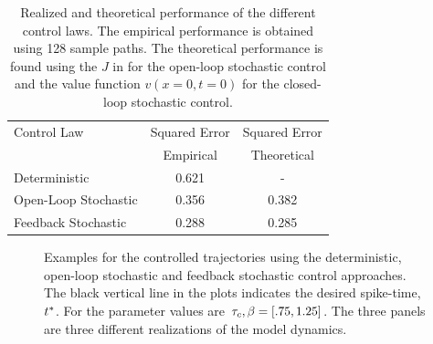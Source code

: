 \documentclass{article}
\begin{document}
\begin{table}[h] 
\centering
\begin{tabular}{lcc}
Control Law & Squared Error &  Squared Error \\
 & Empirical & Theoretical\\
\hline
Deterministic &  0.621 & - \\
Open-Loop Stochastic & 0.356 & 0.382\\
Feedback Stochastic &  0.288& 0.285\\
\hline
\end{tabular}
\caption{Realized and theoretical performance of the different control laws. The empirical
performance is obtained using 128 sample paths. The theoretical performance is
found using the $J$ in for the open-loop stochastic control and the value
function $v(x=0, t =0)$ for the closed-loop stochastic control.}
\label{tab:realized_avg_errors_det_vs_openloop_vs_stoch}
\end{table}
\begin{figure}[h]
\begin{center}
\caption[]{Examples for the controlled trajectories using the deterministic,
open-loop stochastic and feedback stochastic control approaches. The
black vertical line in the plots indicates the desired spike-time, ${ t^* }$.
For the parameter values are ${ \tau_{c} }, {\beta} = [.75, 1.25]$. The three panels are
three different realizations of the model dynamics.}
\label{fig:control_trajectories_examples}
\end{center}
\end{figure}
\end{document}
